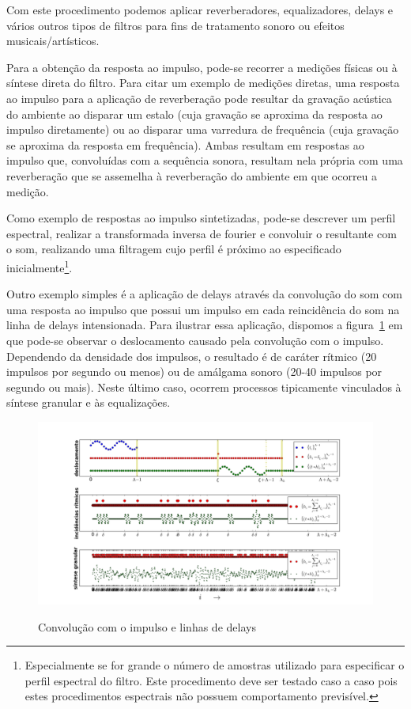 \begin{itemize}
Com este procedimento podemos aplicar reverberadores, equalizadores, delays
e vários outros tipos de filtros para fins de tratamento sonoro ou
efeitos musicais/artísticos.
 
Para a obtenção da resposta ao impulso, pode-se recorrer a medições
físicas ou à síntese direta do filtro. Para citar um exemplo
de medições diretas, uma resposta ao impulso para a aplicação
de reverberação pode resultar da gravação acústica do ambiente ao disparar
um estalo (cuja gravação se aproxima da resposta ao impulso diretamente) ou ao disparar uma
varredura de frequência (cuja gravação se aproxima da resposta em frequência).
Ambas resultam em respostas ao impulso
que, convoluídas com a sequência sonora, resultam nela própria
com uma reverberação que se assemelha à reverberação do ambiente 
em que ocorreu a medição.

Como exemplo de respostas ao impulso sintetizadas, pode-se
descrever um perfil espectral, realizar a transformada inversa
de fourier e convoluir o resultante com o som, realizando
uma filtragem cujo perfil é próximo ao especificado inicialmente\footnote{Especialmente
se for grande o número de amostras utilizado para especificar o perfil espectral
do filtro. Este procedimento deve ser testado caso a caso pois estes procedimentos
espectrais não possuem comportamento previsível.}.

Outro exemplo simples é a aplicação de delays através
da convolução do som com uma resposta ao impulso que possui um impulso
em cada reincidência do som na linha de delays intensionada.
Para ilustrar essa aplicação, dispomos a figura~\ref{fig:delays}
em que pode-se observar o deslocamento causado pela convolução
com o impulso. Dependendo da densidade dos impulsos, o resultado
é de caráter rítmico (20 impulsos por segundo ou menos) ou de amálgama
sonoro (20-40 impulsos por segundo ou mais). Neste último caso,
ocorrem processos tipicamente vinculados à síntese granular e às
equalizações.

\begin{figure}[h!]
    \centering
    \caption{Convolução com o impulso e linhas de delays}
        \includegraphics[width=\textwidth]{figuras/delays__}
        \label{fig:delays}
\end{figure}



\end{itemize}

